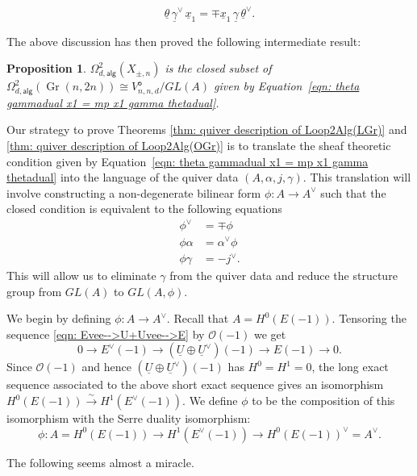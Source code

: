 \documentclass{amsart}
\newtheorem{proposition}[theorem]{Proposition}
\theoremstyle{definition}
\newcommand{\OO}{\mathcal{O}}
\newcommand{\UL}[1]{\underline{#1}}
\newcommand{\alg}{\mathsf{alg}}
\newcommand{\open}{\mathsf{o}}
\newcommand{\Gr}{\operatorname{Gr}}
\newcommand{\LoopTwo}{\Omega^{2}_{d,\alg}}
\newcommand{\Xpm}{X_{\pm,n}}
\begin{document}
\begin{equation}\label{eqn: theta gammadual x1 = mp x1 gamma thetadual}
\UL{\theta}\, \UL{\gamma}^{\vee}\, \UL{x}_{1} =  \mp \UL{x}_{1}\, 
\UL{\gamma}\,  \UL{\theta}^{\vee }.
\end{equation}

The above discussion has then proved the following intermediate result:

\begin{proposition}\label{prop: Loop2(Xpm) is a closed set in
Loop(Gr(n,2n)) satisfying condition involving theta and gamma}
$\LoopTwo (\Xpm )$ is the closed subset of $\LoopTwo (\Gr(n,2n))\cong
V^{\open}_{n,n,d}/GL(A)$ given by Equation~\eqref{eqn: theta gammadual x1
= mp x1 gamma thetadual}. 
\end{proposition}

Our strategy to prove Theorems \ref{thm: quiver description of
Loop2Alg(LGr)} and \ref{thm: quiver description of Loop2Alg(OGr)} is
to translate the sheaf theoretic condition given by
Equation~\eqref{eqn: theta gammadual x1 = mp x1 gamma thetadual} into
the language of the quiver data $(A,\alpha ,j,\gamma )$. This
translation will involve constructing a non-degenerate bilinear form
$\phi :A\to A^{\vee}$ such that the closed condition is equivalent to
the following equations
\begin{align}\label{eqns: closed conditions}
\phi^{\vee}&= \mp \phi \nonumber \\ 
\phi \alpha &=\alpha^{\vee}\phi \\
\phi \gamma &= - j^{\vee}. \nonumber 
\end{align}
This will allow us to eliminate $\gamma$ from the quiver data and
reduce the structure group from $GL(A)$ to $GL(A,\phi )$.

We begin by defining $\phi :A\to A^{\vee}$. Recall that $A =
H^{0}(E(-1))$. Tensoring the sequence \eqref{eqn:
Evee-->U+Uvee-->E} by $\OO (-1)$ we get
\[
0\to E^{\vee}(-1)\to (\UL{U}\oplus \UL{U}^{\vee})(-1)\to E(-1)\to 0.
\]
Since $\OO (-1)$ and hence $(\UL{U}\oplus \UL{U}^{\vee})(-1)$ has $H^0=H^1=0$, the long exact
sequence associated to the above short exact sequence gives an
 isomorphism $H^{0}(E(-1))\overset \sim \longrightarrow H^{1}(E^{\vee}(-1))$. We define
$\phi$ to be the composition of this isomorphism with the Serre
duality isomorphism: 
\[
\phi : A = H^{0}(E(-1))\to H^{1}(E^{\vee}(-1)) \to H^{0}(E(-1))^{\vee}=A^{\vee}.
\]

The following seems almost a miracle.
\end{document}
